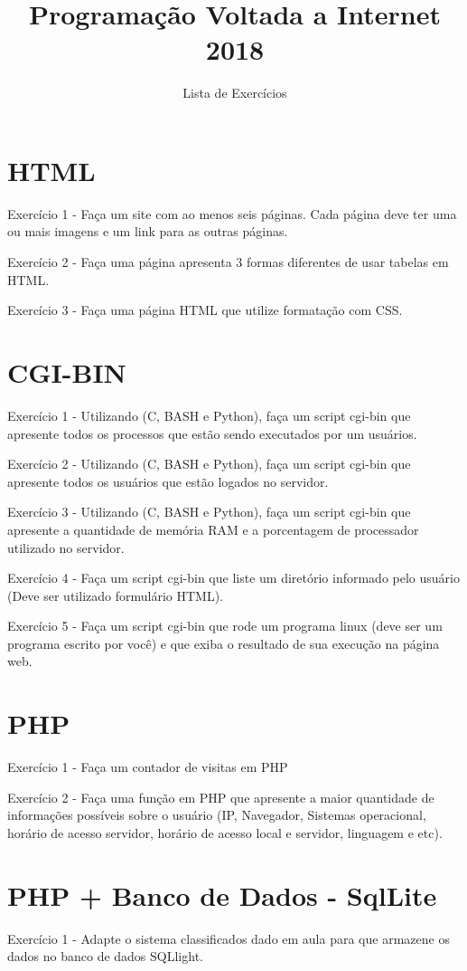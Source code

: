 \documentclass[11pt]{amsart}
\title{Programação Voltada a Internet 2018}
\author{Lista de Exercícios}
\begin{document}
\maketitle

\newpage
\section{HTML}
Exercício 1 - Faça um site com ao menos seis páginas. Cada página deve ter uma ou mais imagens e um link para as outras páginas. 

Exercício 2 - Faça uma página apresenta 3 formas diferentes de usar tabelas em HTML. 

Exercício 3 - Faça uma página HTML que utilize formatação com CSS. 

\section{CGI-BIN}
Exercício 1 - Utilizando (C, BASH e Python), faça um script cgi-bin que apresente todos os processos que estão sendo executados por um usuários.

Exercício 2 - Utilizando (C, BASH e Python), faça um script cgi-bin que apresente todos os usuários que estão logados no servidor.

Exercício 3 - Utilizando (C, BASH e Python), faça um script cgi-bin que apresente a quantidade de memória RAM e a porcentagem de processador utilizado no servidor.

Exercício 4 - Faça um script cgi-bin que liste um diretório informado pelo usuário (Deve ser utilizado formulário HTML). 

Exercício 5 - Faça um script cgi-bin que rode um programa linux (deve ser um programa escrito por você) e que exiba o resultado de sua execução na página web. 

\section{PHP}
Exercício 1 - Faça um contador de visitas em PHP

Exercício 2 - Faça uma função em PHP que apresente a maior quantidade de informações possíveis sobre o usuário (IP, Navegador, Sistemas operacional, horário de acesso servidor, horário de acesso local e servidor, linguagem e etc). 

\section{PHP + Banco de Dados - SqlLite}
Exercício 1 - Adapte o sistema classificados dado em aula para que armazene os dados no banco de dados SQLlight. 
\end{document}
